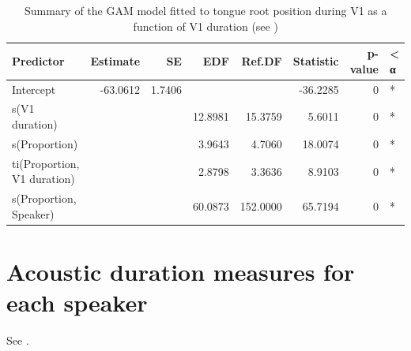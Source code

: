 \documentclass[preprint]{JASAnew}
\begin{document}
\begin{table}

\caption{\label{tab:tra-gam-ar-2-table}Summary of the GAM model fitted to tongue root position during V1 as a function of V1 duration (see )}
\centering
\fontsize{10}{12}\selectfont
\begin{tabular}[t]{lrrrrrrl}
\toprule
Predictor & Estimate & SE & EDF & Ref.DF & Statistic & p-value & < α\\
\midrule
Intercept & -63.0612 & 1.7406 &  &  & -36.2285 & 0 & *\\
s(V1 duration) &  &  & 12.8981 & 15.3759 & 5.6011 & 0 & *\\
s(Proportion) &  &  & 3.9643 & 4.7060 & 18.0074 & 0 & *\\
ti(Proportion, V1 duration) &  &  & 2.8798 & 3.3636 & 8.9103 & 0 & *\\
s(Proportion, Speaker) &  &  & 60.0873 & 152.0000 & 65.7194 & 0 & *\\
\bottomrule
\end{tabular}
\end{table}

\hypertarget{acoustic-duration-measures-for-each-speaker}{%
\section{Acoustic duration measures for each
speaker}\label{acoustic-duration-measures-for-each-speaker}}

See .
\end{document}
